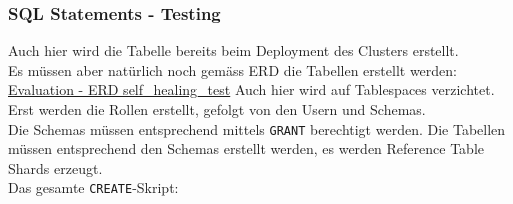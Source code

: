 \subsubsection{SQL Statements - Testing}
\label{subsubsec:stackgres_citus_self-healing-testing_sql}
Auch hier wird die Tabelle bereits beim Deployment des Clusters erstellt.\\
Es müssen aber natürlich noch gemäss ERD die Tabellen erstellt werden:
\hyperref[subsubsec:erd_self_healing_test]{Evaluation - ERD self\_healing\_test}
Auch hier wird auf Tablespaces verzichtet.\\
Erst werden die Rollen erstellt, gefolgt von den Usern und Schemas.\\
Die Schemas müssen entsprechend mittels \texttt{GRANT} berechtigt werden.
Die Tabellen müssen entsprechend den Schemas erstellt werden, es werden Reference Table Shards erzeugt.\\
Das gesamte \texttt{CREATE}-Skript:
\lstset{style=gra_codestyle}
